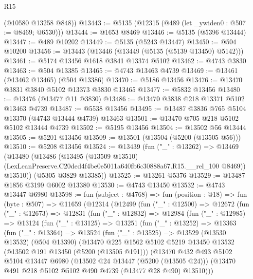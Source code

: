 \begin{lexlean}{R15}
\begin{coremodule}
{{{{{{{{{{{      (@10580 @13258 @848))
@13443 := @5135 (@12315 (@489 (let _ywiden0 : @507 := @8469; @6530)))
@13444 := @1653 @8469
@13446 := @5135 (@5396 @13444)
@13447 := @489 @10202
@13449 := @5135 (@5243 @13447)
@13450 := @504 @10200
@13456 := @13443 (@13446 (@13449 (@5135 (@5139 @13450) @5142)))
@13461 := @5174 @13456 @1618 @3841 @13374 @5102
@13462 := @4743 @3830
@13463 := @504 @13385
@13465 := @4743 @13463 @4739
@13469 := @13461 (@13462 @13465) (@504 @13386)
@13470 := @5186 @13456
@13476 := @13470 @3831 @3840 @5102 @13373 @3830 @13465
@13477 := @5832 @13456
@13480 := @13476 (@13477 @11 @3830)
@13486 := @13470 @3838 @218 @13371 @5102 @13463 @4739
@13487 := @5538 @13456
@13495 := @13487 @3836 @765 @5104 @13370 (@4743 @13444 @4739) @13463
@13501 := @13470 @705 @218 @5102 @5102 @13444 @4739
@13502 := @5195 @13456
@13504 := @13502 @56 @13444
@13505 := @5201 @13456
@13509 := @13501 (@13504 (@5200 (@13505 @56)))
@13510 := @5208 @13456
@13524 := @13439
    (fun ("_" : @13262) =>
    @13469
      (@13480
        (@13486
          (@13495
            (@13509 @13510)
            (LexLeanPreserve.C20ded4f4be0e5011a640fb6c30888a67.R15.__rel_100 @8469))
          @13510))
      (@5305 @3829 @13385))
@13525 := @13261 @5376
@13529 := @13487 @1856 @3199 @6002 @13380
@13530 := @4743 @13450
@13532 := @4743 @13447 @6980
@13598 := fun (subject : @4768) =>
  fun (position : @18) =>
  fun (byte : @507) =>
  @11659
    (@12314
      (@12499
        (fun ("_" : @12500) =>
        @12672
          (fun ("_" : @12673) =>
          @12831
            (fun ("_" : @12832) =>
            @12984
              (fun ("_" : @12985) =>
              @13124
                (fun ("_" : @13125) =>
                @13251
                  (fun ("_" : @13252) =>
                  @13363
                    (fun ("_" : @13364) =>
                    @13524
                      (fun ("_" : @13525) =>
                      @13529
                        (@13530 @13532)
                        (@504 @13390)
                        (@13470
                          @225
                          @1562
                          @5102
                          @5219
                          @13450
                          @13532
                          (@13502 @191 @13450 (@5200 (@13505 @191)))
                          (@13470
                            @432
                            @493
                            @5102
                            @5104
                            @13447
                            @6980
                            (@13502 @24 @13447 (@5200 (@13505 @24)))
                            (@13470 @491 @218 @5102 @5102 @490 @4739 (@13477 @28 @490) @13510)))
}}}}}}}}}}}
\end{coremodule}
\end{lexlean}
